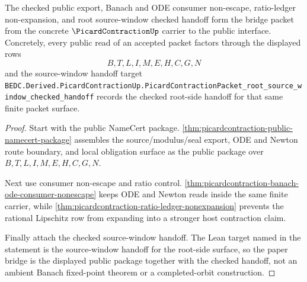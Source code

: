 \begin{theorem}
\label{thm:picardcontraction-bridged-source-window-package}
The checked public export, Banach and ODE consumer non-escape, ratio-ledger non-expansion, and root source-window checked handoff form the bridge packet from the concrete $\PicardContractionUp$ carrier to the public interface. Concretely, every public read of an accepted packet factors through the displayed rows
$$
B,T,L,I,M,E,H,C,G,N
$$
and the source-window handoff target
\texttt{BEDC.Derived.PicardContractionUp.PicardContractionPacket\_root\_source\_window\_checked\_handoff}
records the checked root-side handoff for that same finite packet surface.
\end{theorem}
\begin{proof}
Start with the public NameCert package. \autoref{thm:picardcontraction-public-namecert-package} assembles the source/modulus/seal export, ODE and Newton route boundary, and local obligation surface as the public package over $B,T,L,I,M,E,H,C,G,N$.

Next use consumer non-escape and ratio control. \autoref{thm:picardcontraction-banach-ode-consumer-nonescape} keeps ODE and Newton reads inside the same finite carrier, while \autoref{thm:picardcontraction-ratio-ledger-nonexpansion} prevents the rational Lipschitz row from expanding into a stronger host contraction claim.

Finally attach the checked source-window handoff. The Lean target named in the statement is the source-window handoff for the root-side surface, so the paper bridge is the displayed public package together with the checked handoff, not an ambient Banach fixed-point theorem or a completed-orbit construction.
\end{proof}


